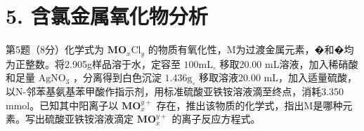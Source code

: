 \section*{5. 含氯金属氧化物分析}
第5题（8分）化学式为 $\mathbf { M O } _ { x } \mathrm { C l } _ { y }$ 的物质有氧化性，M为过渡⾦属元素，�和�均为正整数。将2.905g样品溶于⽔，定容⾄ $1 0 0 \mathrm { m L } _ { \circ }$ 移取20.00 mL溶液，加⼊稀硝酸和⾜量 $\mathrm { A g N O _ { 3 } }$ ，分离得到⽩⾊沉淀 $1 . 4 3 6 \mathrm { g } _ { \circ }$ 移取溶液20.00 mL，加⼊适量硫酸，以N-邻苯基氨基苯甲酸作指⽰剂，⽤标准硫酸亚铁铵溶液滴⾄终点，消耗3.350 mmol。已知其中阳离⼦以 $\mathbf { M O } _ { x } ^ { y + }$ 存在，推出该物质的化学式，指出M是哪种元素。写出硫酸亚铁铵溶液滴定 $\mathbf { M O } _ { x } ^ { y + }$ 的离⼦反应⽅程式。
